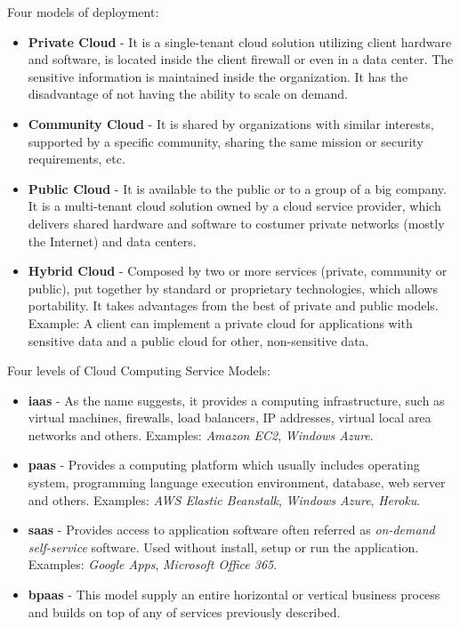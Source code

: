 Four models of deployment:
\begin{itemize}
	\item \textbf{Private Cloud}   - It is a single-tenant cloud solution utilizing client hardware and software, is located inside the client firewall or even in a data center. The sensitive information is maintained inside the organization. It has the disadvantage of not having the ability to scale on demand.

	\item \textbf{Community Cloud} - It is shared by organizations with similar interests, supported by a specific community, sharing the same mission or security requirements, etc.

	\item \textbf{Public Cloud}    - It is available to the public or to a group of a big company. It is a multi-tenant cloud solution owned by a cloud service provider, which delivers shared hardware and software to costumer private networks (mostly the Internet) and data centers.

	\item \textbf{Hybrid Cloud}    - Composed by two or more services (private, community or public), put together by standard or proprietary technologies, which allows portability. It takes advantages from the best of private and public models. Example: A client can implement a private cloud for applications with sensitive data and a public cloud for other, non-sensitive data.
\end{itemize}

Four levels of Cloud Computing Service Models:

\begin{itemize}
	\item \textbf{\acl{iaas}} - As the name suggests, it provides a computing infrastructure, such as virtual machines, firewalls, load balancers, IP addresses, virtual local area networks and others. Examples: \textit{Amazon EC2}, \textit{Windows Azure}.

	\item \textbf{\acl{paas}} - Provides a computing platform which usually includes operating system, programming language execution environment, database, web server and others. Examples: \textit{AWS Elastic Beanstalk}, \textit{Windows Azure}, \textit{Heroku}.

	\item \textbf{\acl{saas}} - Provides access to application software often referred as \textit{on-demand self-service} software. Used without install, setup or run the application.
	Examples: \textit{Google Apps}, \textit{Microsoft Office 365}.

	\item \textbf{\acl{bpaas}} - This model supply an entire horizontal or vertical business process and builds on top of any of services previously described.

\end{itemize}

